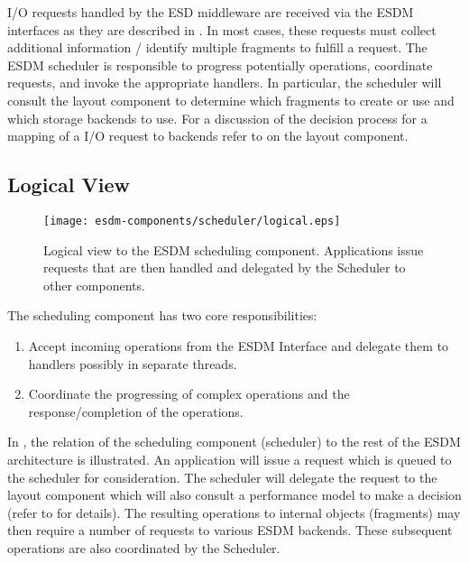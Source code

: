 

I/O requests handled by the ESD middleware are received via the ESDM interfaces as they are described in .
In most cases, these requests must collect additional information / identify multiple fragments to fulfill a request.
The ESDM scheduler is responsible to progress potentially operations, coordinate requests, and invoke the appropriate handlers.
In particular, the scheduler will consult the layout component to determine which fragments to create or use and which storage backends to use.
For a discussion of the decision process for a mapping of a I/O request to backends refer to  on the layout component.


\subsection{Logical View}

\begin{figure}
	\centering
	\texttt{[image: esdm-components/scheduler/logical.eps]}
	\caption{Logical view to the ESDM scheduling component.
	Applications issue requests that are then handled and delegated by the Scheduler to other components.}
	\label{fig:esdm scheduler logical view}
\end{figure}

The scheduling component has two core responsibilities:

\begin{enumerate}
	\item Accept incoming operations from the ESDM Interface and delegate them to handlers possibly in separate threads.
	\item Coordinate the progressing of complex operations and the response/completion of the operations.
\end{enumerate}

In , the relation of the scheduling component (scheduler) to the rest of the ESDM architecture is illustrated.
An application will issue a request which is queued to the scheduler for consideration.
The scheduler will delegate the request to the layout component which will also consult a performance model to make a decision (refer to  for details).
The resulting operations to internal objects (fragments) may then require a number of requests to various ESDM backends.
These subsequent operations are also coordinated by the Scheduler.




